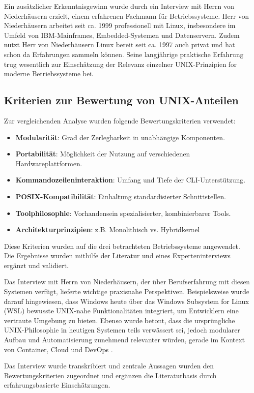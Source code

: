 Ein zusätzlicher Erkenntnisgewinn wurde durch ein Interview mit Herrn von Niederhäusern erzielt, einem erfahrenen Fachmann für Betriebssysteme. Herr von
Niederhäusern arbeitet seit ca. 1999 professionell mit Linux, insbesondere im Umfeld von IBM-Mainframes, Embedded-Systemen und Datenservern. Zudem nutzt Herr von
Niederhäusern Linux bereit seit ca. 1997 auch privat und hat schon da Erfahrungen sammeln können. Seine langjährige praktische Erfahrung trug wesentlich zur
Einschätzung der Relevanz einzelner UNIX-Prinzipien for moderne Betriebssysteme bei.


\subsection{Kriterien zur Bewertung von UNIX-Anteilen}

Zur vergleichenden Analyse wurden folgende Bewertungskriterien verwendet:

\begin{itemize}
	\setlength{\itemsep}{0pt}
	\item \textbf{Modularität}: Grad der Zerlegbarkeit in unabhängige Komponenten.
	\item \textbf{Portabilität}: Möglichkeit der Nutzung auf verschiedenen Hardwareplattformen.
	\item \textbf{Kommandozeileninteraktion}: Umfang und Tiefe der CLI-Unterstützung.
	\item \textbf{POSIX-Kompatibilität}: Einhaltung standardisierter Schnittstellen.
	\item \textbf{Toolphilosophie}: Vorhandensein spezialisierter, kombinierbarer Tools.
	\item \textbf{Architekturprinzipien}: z.B. Monolithisch vs. Hybridkernel
\end{itemize}

Diese Kriterien wurden auf die drei betrachteten Betriebssysteme angewendet. Die Ergebnisse wurden mithilfe der Literatur und eines Experteninterviews ergänzt und
validiert.

\newpage
Das Interview mit Herrn von Niederhäusern, der über Berufserfahrung mit diesen Systemen verfügt, lieferte wichtige praxisnahe Perspektiven. Beispielsweise wurde
darauf hingewiesen, dass Windows heute über das Windows Subsystem for Linux (WSL) bewusste UNIX-nahe Funktionalitäten integriert, um Entwicklern eine vertraute
Umgebung zu bieten. Ebenso wurde betont, dass die ursprüngliche UNIX-Philosophie in heutigen Systemen teils verwässert sei, jedoch modularer Aufbau und
Automatisierung zunehmend relevanter würden, gerade im Kontext von Container, Cloud und DevOps \cite{interviewNH}.

Das Interview wurde transkribiert und zentrale Aussagen wurden den Bewertungskriterien zugeordnet und ergänzen die Literaturbasis durch erfahrungsbasierte
Einschätzungen.